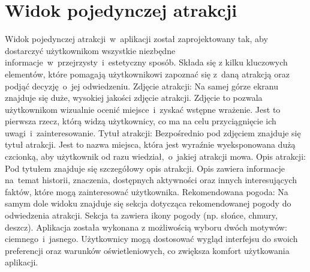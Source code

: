 \section{Widok pojedynczej atrakcji}
\label{sec:atrakcjawidok}
Widok pojedynczej atrakcji~w~aplikacji został zaprojektowany tak, aby dostarczyć 
użytkownikom wszystkie niezbędne informacje~w~przejrzysty~i~estetyczny sposób. 
Składa się z kilku kluczowych elementów, które pomagają użytkownikowi zapoznać się z~daną atrakcją oraz podjąć decyzję~o~jej odwiedzeniu.
\newline
Zdjęcie atrakcji:
Na samej górze ekranu znajduje się duże, wysokiej jakości zdjęcie atrakcji. 
Zdjęcie to pozwala użytkownikom wizualnie ocenić miejsce~i~zyskać wstępne wrażenie. Jest to pierwsza rzecz, którą widzą użytkownicy, co ma na celu przyciągnięcie ich uwagi~i~zainteresowanie.
\newline
Tytuł atrakcji:
Bezpośrednio pod zdjęciem znajduje się tytuł atrakcji. Jest to nazwa miejsca, która jest 
wyraźnie wyeksponowana dużą czcionką, aby użytkownik od razu wiedział,~o~jakiej atrakcji mowa.
\newline
Opis atrakcji:
Pod tytułem znajduje się szczegółowy opis atrakcji. 
Opis zawiera informacje na~temat historii, znaczenia, dostępnych aktywności oraz innych interesujących faktów, które mogą 
zainteresować użytkownika. 
\newline
Rekomendowana pogoda:
Na samym dole widoku znajduje się sekcja dotycząca rekomendowanej 
pogody do odwiedzenia atrakcji. Sekcja ta zawiera ikony pogody (np. słońce, chmury, deszcz). 
\newline
Aplikacja została wykonana z możliwością wyboru dwóch motywów: ciemnego~i~jasnego. 
Użytkownicy mogą dostosować wygląd interfejsu do swoich preferencji oraz warunków oświetleniowych, co zwiększa komfort użytkowania aplikacji.

